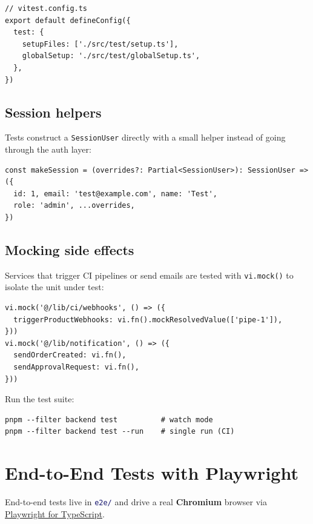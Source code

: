 \documentclass[12pt,a4paper,twoside]{report}
\newcommand{\code}[1]{\texttt{#1}}
\newcommand{\file}[1]{\texttt{\textcolor{MidnightBlue}{#1}}}
\begin{document}
\begin{lstlisting}[style=ts]
// vitest.config.ts
export default defineConfig({
  test: {
    setupFiles: ['./src/test/setup.ts'],
    globalSetup: './src/test/globalSetup.ts',
  },
})
\end{lstlisting}

\subsection*{Session helpers}

Tests construct a \code{SessionUser} directly with a small helper
instead of going through the auth layer:

\begin{lstlisting}[style=ts]
const makeSession = (overrides?: Partial<SessionUser>): SessionUser => ({
  id: 1, email: 'test@example.com', name: 'Test',
  role: 'admin', ...overrides,
})
\end{lstlisting}

\subsection*{Mocking side effects}

Services that trigger CI pipelines or send emails are tested with
\code{vi.mock()} to isolate the unit under test:

\begin{lstlisting}[style=ts]
vi.mock('@/lib/ci/webhooks', () => ({
  triggerProductWebhooks: vi.fn().mockResolvedValue(['pipe-1']),
}))
vi.mock('@/lib/notification', () => ({
  sendOrderCreated: vi.fn(),
  sendApprovalRequest: vi.fn(),
}))
\end{lstlisting}

Run the test suite:
\begin{lstlisting}[style=bash]
pnpm --filter backend test          # watch mode
pnpm --filter backend test --run    # single run (CI)
\end{lstlisting}

\section{End-to-End Tests with Playwright}
\label{sec:e2e-tests}

End-to-end tests live in \file{e2e/} and drive a real
\textbf{Chromium} browser via
\href{https://playwright.dev}{Playwright for TypeScript}.
\end{document}
